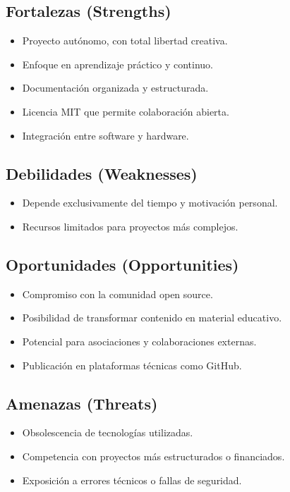 \documentclass[10pt, a4paper, oneside]{article}
\begin{document}
\subsection*{Fortalezas (Strengths)}
\begin{itemize}
  \item Proyecto autónomo, con total libertad creativa.
  \item Enfoque en aprendizaje práctico y continuo.
  \item Documentación organizada y estructurada.
  \item Licencia MIT que permite colaboración abierta.
  \item Integración entre software y hardware.
\end{itemize}

\subsection*{Debilidades (Weaknesses)}
\begin{itemize}
  \item Depende exclusivamente del tiempo y motivación personal.
  \item Recursos limitados para proyectos más complejos.
\end{itemize}

\subsection*{Oportunidades (Opportunities)}
\begin{itemize}
  \item Compromiso con la comunidad open source.
  \item Posibilidad de transformar contenido en material educativo.
  \item Potencial para asociaciones y colaboraciones externas.
  \item Publicación en plataformas técnicas como GitHub.
\end{itemize}

\subsection*{Amenazas (Threats)}
\begin{itemize}
  \item Obsolescencia de tecnologías utilizadas.
  \item Competencia con proyectos más estructurados o financiados.
  \item Exposición a errores técnicos o fallas de seguridad.
\end{itemize}
\end{document}

